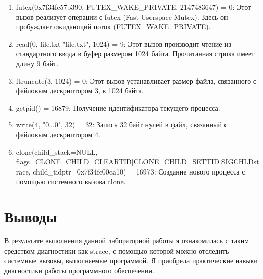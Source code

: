 \documentclass[a4paper, 12pt]{article}
\begin{document}
\begin{enumerate}
    \item futex(0x7f34fc57b390, FUTEX\_WAKE\_PRIVATE, 2147483647) = 0: Этот вызов реализует операции с futex (Fast Userspace Mutex). Здесь он пробуждает ожидающий поток (FUTEX\_WAKE\_PRIVATE).
    \item read(0, file.txt "file.txt", 1024) = 9: 
    Этот вызов производит чтение из стандартного ввода в буфер размером 1024 байта. Прочитанная строка имеет длину 9 байт.    
    \item ftruncate(3, 1024) = 0: Этот вызов устанавливает размер файла, связанного с файловым дескриптором 3, в 1024 байта.
    \item getpid() = 16879: Получение идентификатора текущего процесса.
    \item write(4, "0...0", 32) = 32: 
    Запись 32 байт нулей в файл, связанный с файловым дескриптором 4.
    \item clone(child\_stack=NULL, \\flags=CLONE\_CHILD\_CLEARTID|CLONE\_CHILD\_SETTID|SIGCHLDstrace,
    child\_tidptr=0x7f34fc00ca10) = 16973: Создание нового процесса с помощью системного вызова clone. 
\end{enumerate}

\newpage
\section{Выводы}

В результате выполнения данной лабораторной работы я ознакомилась с таким средством диагностики как strace, с помощью которой можно отследить системные вызовы, выполняемые программой. Я приобрела практические навыки диагностики работы программного обеспечения.
\end{document}

